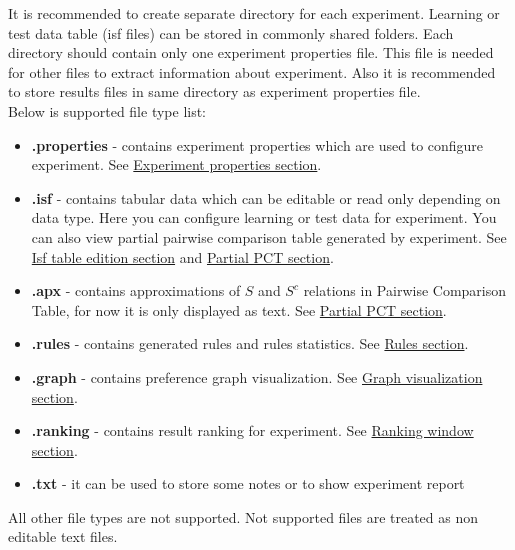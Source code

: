 It is recommended to create separate directory for each experiment. Learning or test data table (isf files) can be stored in commonly shared folders. Each directory should contain only one experiment properties file. This file is needed for other files to extract information about experiment. Also it is recommended to store results files in same directory as experiment properties file.\\

Below is supported file type list:
\begin{itemize}
	\item \textbf{.properties} - contains experiment properties which are used to configure experiment. See \hyperref[section:properties]{Experiment properties section}.
	\item \textbf{.isf} - contains tabular data which can be editable or read only depending on data type. Here you can configure learning or test data for experiment. You can also view partial pairwise comparison table generated by experiment.
	See \hyperref[section:isf-table]{Isf table edition section} and  \hyperref[sub:pct-isf]{Partial PCT section}.
	\item \textbf{.apx} - contains approximations of $S$ and $S^{c}$ relations in Pairwise Comparison Table, for now it is only displayed as text.
	See \hyperref[sub:pct-apx]{Partial PCT section}.
	\item \textbf{.rules} - contains generated rules and rules statistics.
	See \hyperref[section:rules]{Rules section}.
	\item \textbf{.graph} - contains preference graph visualization.
	See \hyperref[section:graph]{Graph visualization section}.
	\item \textbf{.ranking} - contains result ranking for experiment.
	See \hyperref[section:ranking]{Ranking window section}.
	\item \textbf{.txt} - it can be used to store some notes or to show experiment report
\end{itemize}

All other file types are not supported. Not supported files are treated as non editable text files.

\vfill\newpage